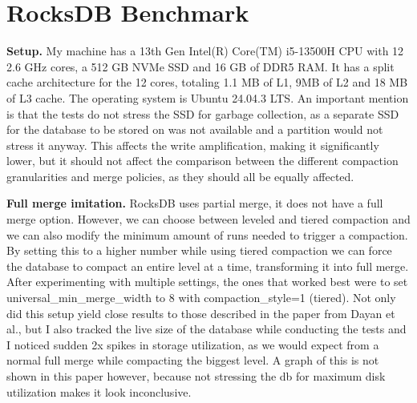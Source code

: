 \documentclass[sigconf]{acmart}
\begin{document}
\section{RocksDB Benchmark}
\textbf{Setup.} My machine has a 13th Gen Intel(R) Core(TM) i5-13500H CPU with 12 2.6 GHz cores, a 512 GB NVMe SSD and  16 GB of DDR5 RAM. It has a split cache architecture for the 12 cores, totaling 1.1 MB of L1, 9MB of L2 and 18 MB of L3 cache. The operating system is Ubuntu 24.04.3 LTS. An important mention is that the tests do not stress the SSD for garbage collection, as a separate SSD for the database to be stored on was not available and a partition would not stress it anyway. This affects the write amplification, making it significantly lower, but it should not affect the comparison between the different compaction granularities and merge policies, as they should all be equally affected.

\textbf{Full merge imitation.} RocksDB uses partial merge, it does not have a full merge option. However, we can choose between leveled and tiered compaction and we can also modify the minimum amount of runs needed to trigger a compaction. By setting this to a higher number while using tiered compaction we can force the database to compact an entire level at a time, transforming it into full merge. After experimenting with multiple settings, the ones that worked best were to set universal\_min\_merge\_width to 8 with compaction\_style=1 (tiered). Not only did this setup yield close results to those described in the paper from Dayan et al., but I also tracked the live size of the database while conducting the tests and I noticed sudden 2x spikes in storage utilization, as we would expect from a normal full merge while compacting the biggest level. A graph of this is not shown in this paper however, because not stressing the db for maximum disk utilization makes it look inconclusive. 
\end{document}
